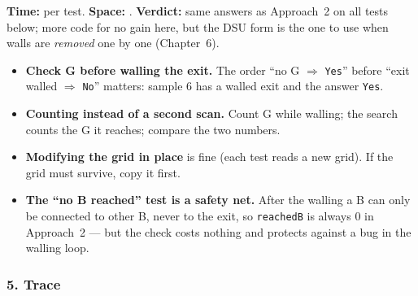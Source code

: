 \begin{alternativebox}
\begin{complexitybox}
\textbf{Time:}  per test. \textbf{Space:} . \textbf{Verdict:} same answers as Approach~2 on all tests below; more code for no gain here, but the DSU form is the one to use when walls are \emph{removed} one by one (Chapter~6).
\end{complexitybox}
\end{alternativebox}

\begin{tricksbox}
\begin{itemize}[leftmargin=*]
    \item \textbf{Check G before walling the exit.} The order ``no G $\Rightarrow$ \texttt{Yes}'' before ``exit walled $\Rightarrow$ \texttt{No}'' matters: sample 6 has a walled exit and the answer \texttt{Yes}.
    \item \textbf{Counting instead of a second scan.} Count G while walling; the search counts the G it reaches; compare the two numbers.
    \item \textbf{Modifying the grid in place} is fine (each test reads a new grid). If the grid must survive, copy it first.
    \item \textbf{The ``no B reached'' test is a safety net.} After the walling a B can only be connected to other B, never to the exit, so \texttt{reachedB} is always 0 in Approach~2 --- but the check costs nothing and protects against a bug in the walling loop.
\end{itemize}
\end{tricksbox}

\subsubsection*{5. Trace}

